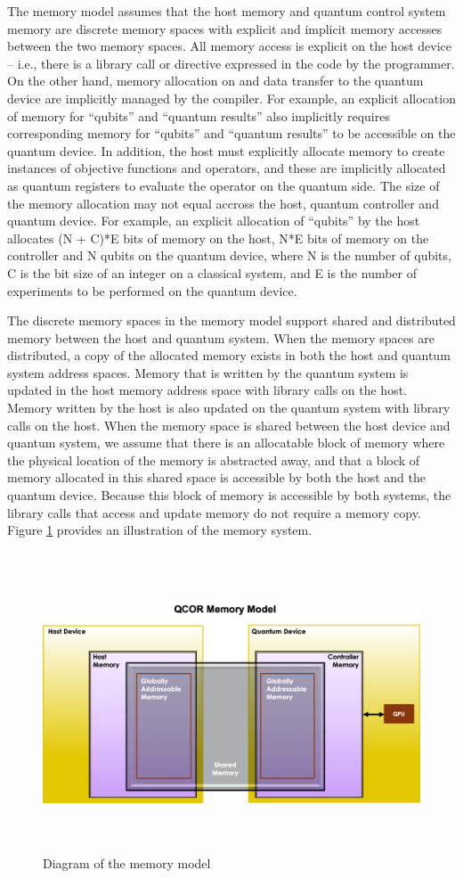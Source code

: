 The \qcor memory model assumes that the host memory and quantum control system memory are discrete memory spaces with explicit and implicit memory accesses between the two memory spaces.  
All memory access is explicit on the host device -- i.e., there is a library call or directive expressed in the code by the programmer. On the other hand, memory allocation on and data transfer to the quantum device are implicitly managed by the compiler. For example, an explicit allocation of memory for ``qubits'' and ``quantum results'' also implicitly requires corresponding memory for ``qubits'' and ``quantum results'' to be accessible on the quantum device. In addition, the host must explicitly allocate memory to create instances of objective functions and operators, and these are implicitly allocated as quantum registers to evaluate the operator on the quantum side. The size of the memory allocation may not equal accross the host, quantum controller and quantum device.  For example, an explicit allocation of ``qubits'' by the host allocates (N + C)*E bits of memory on the host, N*E bits of memory on the controller and N qubits on the quantum device, where N is the number of qubits, C is the bit size of an integer on a classical system, and E is the number of experiments to be performed on the quantum device.

The discrete memory spaces in the \qcor memory model support shared and distributed memory between the host and quantum system. 
When the memory spaces are distributed, a copy of the allocated memory exists in both the host and quantum system address spaces.  
Memory that is written by the quantum system is updated in the host memory address space with library calls on the host. 
Memory written by the host is also updated on the quantum system with library calls on the host.  
When the memory space is shared between the host device and quantum system, we assume that there is an allocatable block of memory where the physical location of the memory is abstracted away, and that a block of memory allocated in this shared space is accessible by both the host and the quantum device. Because this block of memory is accessible by both systems, the library calls that access and update memory do not require a memory copy. Figure \ref{fig:mem_model} provides an illustration of the memory system.

\begin{figure}[ht]
 \centering
  \includegraphics[height=3.5in,width=5.5in]{figures/Memory_Model_Illustration_v4.png}
  \caption{Diagram of the \qcor memory model}
  \label{fig:mem_model}
\end{figure}
